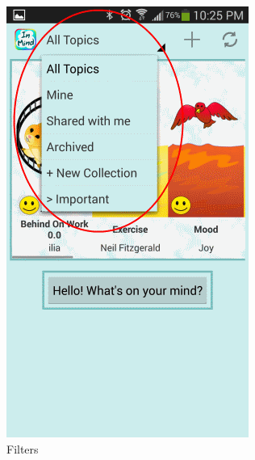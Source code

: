 \begin{figure}
\begin{subfigure}[b]{0.3\textwidth}
        \includegraphics[width=\textwidth]{home_nav.png}
        \caption{Filters}
      \end{subfigure}
      \begin{subfigure}[b]{0.3\textwidth}

\end{subfigure}
\end{figure}
